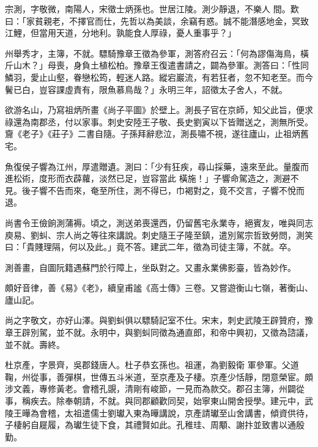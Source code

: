 \begin{pinyinscope}
 宗測，字敬微，南陽人，宋徵士炳孫也。世居江陵。測少靜退，不樂人
 間。歎曰：「家貧親老，不擇官而仕，先哲以為美談，余竊有惑。誠不能潛感地金，冥致江鯉，但當用天道，分地利。孰能食人厚祿，憂人重事乎？」



 州舉秀才，主簿，不就。驃騎豫章王徵為參軍，測答府召云：「何為謬傷海鳥，橫斤山木？」母喪，身負土植松柏。豫章王復遣書請之，闢為參軍。測答曰：「性同鱗羽，愛止山壑，眷戀松筠，輕迷人路。縱宕巖流，有若狂者，忽不知老至。而今鬢已白，豈容課虛責有，限魚慕鳥哉？」永明三年，詔徵太子舍人，不就。



 欲游名山，乃寫祖炳所畫《尚子平圖》於壁上。測長子官在京師，知父此旨，便求祿還為南郡丞，付以家事。刺史安陸王子敬、長史劉寅以下皆贈送之，測無所受。齎《老子》《莊子》二書自隨。子孫拜辭悲泣，測長嘯不視，遂往廬山，止祖炳舊宅。



 魚復侯子響為江州，厚遣贈遺。測曰：「少有狂疾，尋山採藥，遠來至此。量腹而進松術，度形而衣薜蘿，淡然已足，豈容當此
 橫施！」子響命駕造之，測避不見。後子響不告而來，奄至所住，測不得已，巾褐對之，竟不交言，子響不悅而退。



 尚書令王儉餉測蒲褥。頃之，測送弟喪還西，仍留舊宅永業寺，絕賓友，唯與同志庾易、劉虯、宗人尚之等往來講說。刺史隨王子隆至鎮，遣別駕宗哲致勞問，測笑曰：「貴賤理隔，何以及此。」竟不答。建武二年，徵為司徒主簿，不就。卒。



 測善畫，自圖阮籍遇蘇門於行障上，坐臥對之。又畫永業佛影臺，皆為妙作。



 頗好音律，善《易》《老》，續皇甫謐《高士傳》三卷。又嘗遊衡山七嶺，著衡山、廬山記。



 尚之字敬文，亦好山澤。與劉虯俱以驃騎記室不仕。宋末，刺史武陵王辟贊府，豫章王辟別駕，並不就。永明中，與劉虯同徵為通直郎，和帝中興初，又徵為諮議，並不就。壽終。



 杜京產，字景齊，吳郡錢唐人。杜子恭玄孫也。祖運，為劉毅衛
 軍參軍。父道鞠，州從事，善彈棋，世傳五斗米道，至京產及子棲。京產少恬靜，閉意榮宦。頗涉文義，專修黃老。會稽孔覬，清剛有峻節，一見而為款交。郡召主簿，州闢從事，稱疾去。除奉朝請，不就。與同郡顧歡同契，始寧東山開舍授學。建元中，武陵王曄為會稽，太祖遣儒士劉瓛入東為曄講說，京產請瓛至山舍講書，傾資供待，子棲躬自屣履，為瓛生徒下食，其禮賢如此。孔稚珪、周顒、謝抃並致書以通殷勤。




\end{pinyinscope}
